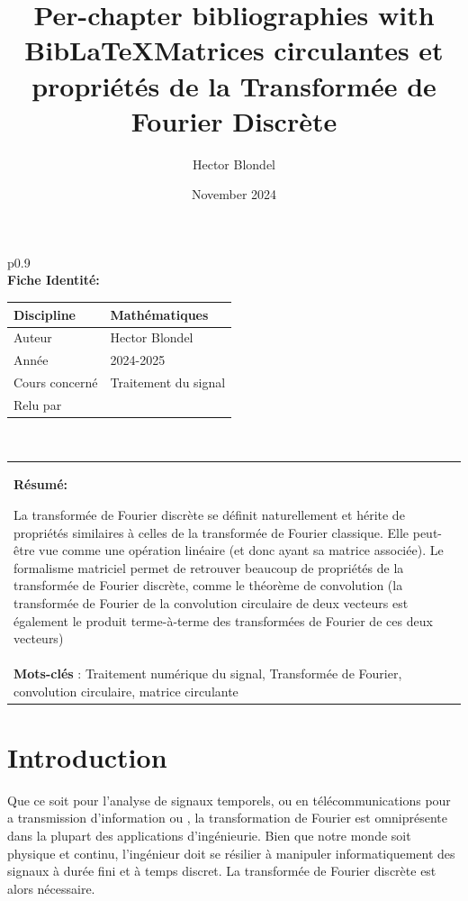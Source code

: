 \documentclass[11pt,oneside]{article}
\title{Per-chapter bibliographies with BibLaTeX}
\title{Matrices circulantes et propriétés de la Transformée de Fourier Discrète}
\author{Hector Blondel}
\date{November 2024}
\newenvironment{ficheId}
{\begin{center}
    \begin{tabular}{p{0.9\textwidth}}
    \\
    \textbf{Fiche Identité:}
    }
    { 
    \\
    \end{tabular} 
    \end{center}
    }
\newenvironment{resume}
{\begin{center}
    \begin{tabular}{p{0.7\textwidth}}
    \\
    \textbf{Résumé:}
    }
    { 
    \\
    \end{tabular} 
    \end{center}
    }
\begin{document}
\maketitle

\begin{ficheId}
\begin{center}
\begin{tabular}{|l|l|}
\hline
Discipline & Mathématiques \\
\hline
Auteur  & Hector Blondel \\
\hline
Année   & 2024-2025 \\
\hline
Cours concerné  & Traitement du signal \\
\hline
Relu par & \\
\hline
\end{tabular}
\end{center}
\end{ficheId}

\begin{resume}
La transformée de Fourier discrète se définit naturellement et hérite de propriétés similaires à celles de la transformée de Fourier classique. Elle peut-être vue comme une opération linéaire (et donc ayant sa matrice associée). Le formalisme matriciel permet de retrouver beaucoup de propriétés de la transformée de Fourier discrète, comme le théorème de convolution (la transformée de Fourier de la convolution circulaire de deux vecteurs est également le produit terme-à-terme des transformées de Fourier de ces deux vecteurs)  \\

\textbf{Mots-clés} : Traitement numérique du signal, Transformée de Fourier, convolution circulaire, matrice circulante
\end{resume}

\minitoc





\section*{Introduction}

Que ce soit pour l'analyse de signaux temporels, ou en télécommunications pour a transmission d'information ou , la transformation de Fourier est omniprésente dans la plupart des applications d'ingénieurie. Bien que notre monde soit physique et continu, l'ingénieur doit se résilier à manipuler informatiquement des signaux à durée fini et à temps discret. La transformée de Fourier discrète est alors nécessaire.
\end{document}
